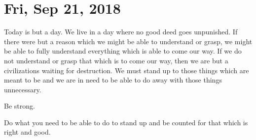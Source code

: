 \section{Fri, Sep 21, 2018}

Today is but a day. We live in a day where no good deed goes unpunished. If there
were but a reason which we might be able to understand or grasp, we might be able to
fully understand everything which is able to come our way. If we do not understand or
grasp that which is to come our way, then we are but a civilizations waiting for
destruction. We must stand up to those things which are meant to be and we are in
need to be able to do away with those things unnecessary.

Be strong.

Do what you need to be able to do to stand up and be counted for that which is right
and good.
